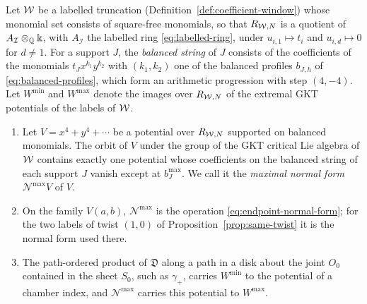 \begin{proposition}
\label{rem:normal-form-general}
Let $\mathcal W$ be a labelled truncation (Definition~\ref{def:coefficient-window})
whose monomial set consists of square-free monomials, so that $R_{\mathcal W,N}$ is
a quotient of $A_{\mathcal I}\otimes_\mathbb Q\Bbbk$, with $A_{\mathcal I}$ the
labelled ring \eqref{eq:labelled-ring}, under $u_{i,1}\mapsto t_i$ and
$u_{i,d}\mapsto0$ for $d\neq1$.  For a support $J$, the \emph{balanced
string} of $J$ consists of the coefficients of the monomials
$t_Jx^{k_1}y^{k_2}$ with $(k_1,k_2)$ one of the balanced profiles $b_{J,h}$
of \eqref{eq:balanced-profiles}, which form an arithmetic progression with
step $(4,-4)$.  Let $W^{\min}$ and $W^{\max}$ denote the images
over $R_{\mathcal W,N}$ of the extremal GKT potentials of the labels of $\mathcal W$.
\begin{enumerate}
\item Let $V=x^4+y^4+\cdots$ be a potential over $R_{\mathcal W,N}$ supported on
balanced monomials.  The orbit of $V$ under the group of the GKT critical
Lie algebra of $\mathcal W$ contains exactly one potential whose coefficients on the
balanced string of each support $J$ vanish except at $b_J^{\max}$.  We call it the
\emph{maximal normal form} $\mathcal N^{\max}V$ of $V$.
\item On the family $V(a,b)$, $\mathcal N^{\max}$ is the operation
\eqref{eq:endpoint-normal-form}; for the two labels of twist $(1,0)$ of
Proposition~\ref{prop:same-twist} it is the normal form used there.
\item The path-ordered product of $\mathfrak D$ along a path in a disk about
the joint $O_0$ contained in the sheet $S_0$, such as $\gamma_+$, carries
$W^{\min}$ to the
potential of a chamber index, and $\mathcal N^{\max}$ carries this potential
to $W^{\max}$.
\end{enumerate}
\end{proposition}

